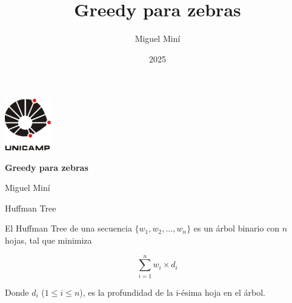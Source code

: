 \documentclass[12pt]{beamer}
\title{Greedy para zebras}
\author{Miguel Miní}
\date{2025}
\begin{document}
\begin{frame}

  {\hspace{9cm}\includegraphics[width=0.15\textwidth]{img/unicamp.png}}
  
  
  
  {\hspace{0.5cm}\bfseries\Huge \textcolor{rojoUNI}{Greedy para zebras}}

   \vspace{0.5cm}
  {\hspace{0.6cm}\textcolor{rojoUNI}{Miguel Miní}}
  
  \vfill
\end{frame}


\begin{frame}{Huffman Tree}

\begin{definicion}
    El Huffman Tree de una secuencia $\{w_1, w_2, \dots, w_n\}$ es un árbol binario con $n$ hojas, tal que minimiza

\[
    \sum_{i=1}^n w_i \times d_i  
\]

    Donde $d_i$ ($1 \le i \le n$), es la profundidad de la i-ésima hoja en el árbol.
\end{definicion}
  
\end{frame}
\end{document}
